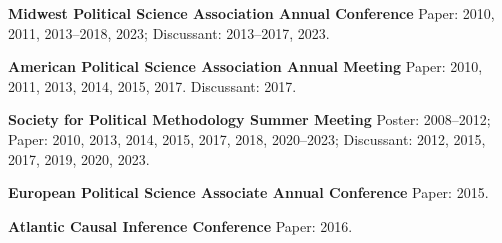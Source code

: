 \documentclass[11pt,article,oneside]{memoir}
\begin{document}
\begin{cvlist}[itemsep = 0em, parsep = 0em]
\item  {\bfseries Midwest Political Science Association Annual Conference} Paper: 2010, 2011, 2013--2018, 2023; Discussant: 2013--2017, 2023.
\item  {\bfseries American Political Science Association Annual Meeting} Paper: 2010, 2011, 2013, 2014, 2015, 2017. Discussant: 2017.
\item  {\bfseries Society for Political Methodology Summer Meeting} Poster: 2008--2012; Paper: 2010, 2013, 2014, 2015, 2017, 2018, 2020--2023; Discussant: 2012, 2015, 2017, 2019, 2020, 2023. 
\item  {\bfseries European Political Science Associate Annual Conference} Paper: 2015. 
\item  {\bfseries Atlantic Causal Inference Conference} Paper: 2016. 
\end{cvlist}
\bigskip
\end{document}
